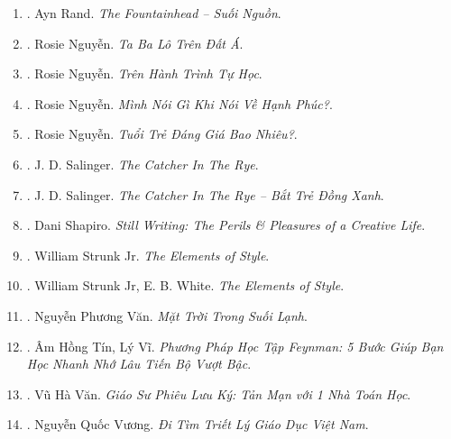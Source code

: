 \documentclass{article}
\begin{document}
\begin{enumerate}
	\item \cite{Rand_fountainhead}. Ayn Rand. {\it The Fountainhead -- Suối Nguồn}.\hfill{\sf[done]}

	\item \cite{Rosie_travel}. Rosie Nguyễn. {\it Ta Ba Lô Trên Đất Á}.\hfill{\sf[done]}

	\item \cite{Rosie_self_study}. Rosie Nguyễn. {\it Trên Hành Trình Tự Học}.\hfill{\sf[done]}

	\item \cite{Rosie_happy}. Rosie Nguyễn. {\it Mình Nói Gì Khi Nói Về Hạnh Phúc?}.\hfill{\sf[done]}

	\item \cite{Rosie_youth}. Rosie Nguyễn. {\it Tuổi Trẻ Đáng Giá Bao Nhiêu?}.\hfill{\sf[done]}

	\item \cite{Salinger_catcher_in_rye}. {\sc J. D. Salinger}. {\it The Catcher In The Rye}.

	\item \cite{Salinger_btdx}. {\sc J. D. Salinger}. {\it The Catcher In The Rye -- Bắt Trẻ Đồng Xanh}.\hfill{\sf[done]}

	\item \cite{Shapiro2014}. Dani Shapiro. {\it Still Writing: The Perils \& Pleasures of a Creative Life}.\hfill{\sf[reading]}

	\item \cite{Strunk_element_style}. William Strunk Jr. {\it The Elements of Style}.\hfill{\sf[done]}

	\item \cite{Strunk_White_element_style}. William Strunk Jr, E. B. White. {\it The Elements of Style}.\hfill{\sf[done]}

	\item \cite{Van_mat_troi_suoi_lanh}. Nguyễn Phương Văn. {\it Mặt Trời Trong Suối Lạnh}.\hfill{\sf[done]}

	\item \cite{Tin_Vi_Feynmann_learn_methods}. {\sc Âm Hồng Tín, Lý Vĩ}. {\it Phương Pháp Học Tập Feynman: 5 Bước Giúp Bạn Học Nhanh Nhớ Lâu Tiến Bộ Vượt Bậc}.\hfill{\sf[done]}

	\item \cite{Van_prof_journey}. Vũ Hà Văn. {\it Giáo Sư Phiêu Lưu Ký: Tản Mạn với 1 Nhà Toán Học}.\hfill{\sf[done]}

	\item \cite{Vuong_edu_philosophy}. {\sc Nguyễn Quốc Vương}. {\it Đi Tìm Triết Lý Giáo Dục Việt Nam}.\hfill{\sf[done]}


\end{enumerate}
\end{document}
